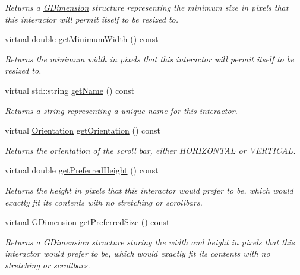 \begin{DoxyCompactItemize}
\begin{DoxyCompactList}\small\item\em Returns a \mbox{\hyperlink{structGDimension}{G\+Dimension}} structure representing the minimum size in pixels that this interactor will permit itself to be resized to. \end{DoxyCompactList}\item 
virtual double \mbox{\hyperlink{classGInteractor_a59e668114fe3d49d2a0f28deb258f7c8}{get\+Minimum\+Width}} () const
\begin{DoxyCompactList}\small\item\em Returns the minimum width in pixels that this interactor will permit itself to be resized to. \end{DoxyCompactList}\item 
virtual std\+::string \mbox{\hyperlink{classGInteractor_a8a60438a5b55d0b2ceb35c8674b9d8c5}{get\+Name}} () const
\begin{DoxyCompactList}\small\item\em Returns a string representing a unique name for this interactor. \end{DoxyCompactList}\item 
virtual \mbox{\hyperlink{classGScrollBar_a871118a09520247c78a71ecd7b0abd58}{Orientation}} \mbox{\hyperlink{classGScrollBar_a816fab656ead9b4f927bff46ae5a0e4d}{get\+Orientation}} () const
\begin{DoxyCompactList}\small\item\em Returns the orientation of the scroll bar, either H\+O\+R\+I\+Z\+O\+N\+T\+AL or V\+E\+R\+T\+I\+C\+AL. \end{DoxyCompactList}\item 
virtual double \mbox{\hyperlink{classGInteractor_a747de0961653847bdc6615dbf756d715}{get\+Preferred\+Height}} () const
\begin{DoxyCompactList}\small\item\em Returns the height in pixels that this interactor would prefer to be, which would exactly fit its contents with no stretching or scrollbars. \end{DoxyCompactList}\item 
virtual \mbox{\hyperlink{structGDimension}{G\+Dimension}} \mbox{\hyperlink{classGInteractor_a4aabbee761d8e9116275401131b7ccd1}{get\+Preferred\+Size}} () const
\begin{DoxyCompactList}\small\item\em Returns a \mbox{\hyperlink{structGDimension}{G\+Dimension}} structure storing the width and height in pixels that this interactor would prefer to be, which would exactly fit its contents with no stretching or scrollbars. \end{DoxyCompactList}\item 

\end{DoxyCompactItemize}
